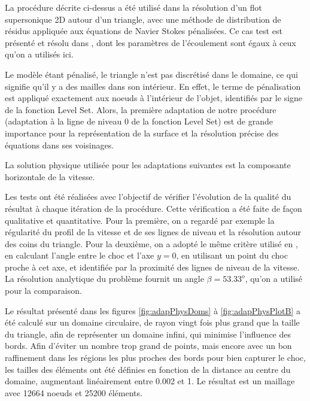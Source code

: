 \indent La procédure décrite ci-dessus a été utilisé dans la résolution d'un flot supersonique 2D autour d'un triangle, avec une méthode de distribution de résidus appliquée aux équations de Navier Stokes pénalisées. Ce cas test est présenté et résolu dans \cite{leo}, dont les paramètres de l'écoulement sont égaux à ceux qu'on a utilisés ici.

\indent Le modèle étant pénalisé, le triangle n'est pas discrétisé dans le domaine, ce qui signifie qu'il y a des mailles dans son intérieur. En effet, le terme de pénalisation est appliqué exactement aux noeuds à l'intérieur de l'objet, identifiés par le signe de la fonction Level Set. Alors, la première adaptation de notre procédure (adaptation à la ligne de niveau 0 de la fonction Level Set) est de grande importance pour la représentation de la surface et la résolution précise des équations dans ses voisinages.

\indent La solution physique utilisée pour les adaptations suivantes est la composante horizontale de la vitesse. 

\indent Les tests ont été réalisées avec l'objectif de vérifier l'évolution de la qualité du résultat à chaque itération de la procédure. Cette vérification a été faite de façon qualitative et quantitative. Pour la première, on a regardé par exemple la régularité du profil de la vitesse et de ses lignes de niveau et la résolution autour des coins du triangle. Pour la deuxième, on a adopté le même critère utilisé en \cite{leo}, en calculant l'angle entre le choc et l'axe \(y=0\), en utilisant un point du choc proche à cet axe, et identifiée par la proximité des lignes de niveau de la vitesse. La résolution analytique du problème fournit un angle \(\beta=53.33^o\), qu'on a utilisé pour la comparaison.

\indent Le résultat présenté dans les figures \ref{fig:adapPhysDoms} à \ref{fig:adapPhysPlotB} a été calculé sur un domaine circulaire, de rayon vingt fois plus grand que la taille du triangle, afin de représenter un domaine infini, qui minimise l'influence des bords. Afin d'éviter un nombre trop grand de points, mais encore avec un bon raffinement dans les régions les plus proches des bords pour bien capturer le choc, les tailles des éléments ont été définies en fonction de la distance au centre du domaine, augmentant linéairement entre 0.002 et 1. Le résultat est un maillage avec 12664 noeuds et 25200 éléments.

\indent

